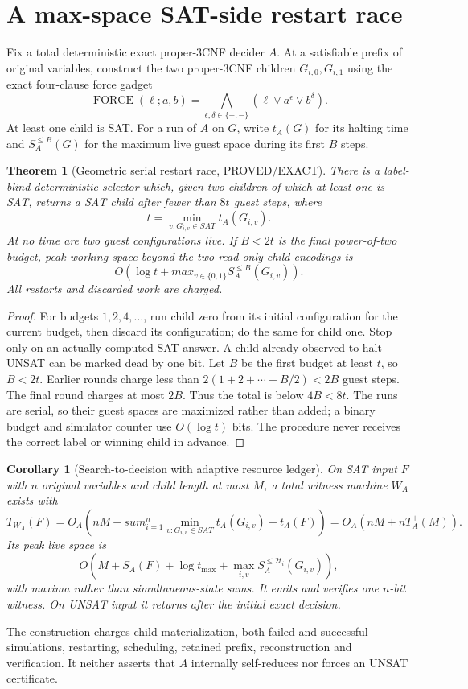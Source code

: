 \documentclass[11pt]{article}
\newtheorem{theorem}{Theorem}
\newtheorem{corollary}{Corollary}
\begin{document}
\section{A max-space SAT-side restart race}
Fix a total deterministic exact proper-3CNF decider $A$.  At a satisfiable
prefix of original variables, construct the two proper-3CNF children
$G_{i,0},G_{i,1}$ using the exact four-clause force gadget
\[
\operatorname{FORCE}(\ell;a,b)=
\bigwedge_{\epsilon,\delta\in\{+,-\}}
(\ell\vee a^\epsilon\vee b^\delta).
\tag{1}
\]
At least one child is SAT.  For a run of $A$ on $G$, write $t_A(G)$ for its
halting time and $S_A^{\le B}(G)$ for the maximum live guest space during its
first $B$ steps.

\begin{theorem}[Geometric serial restart race, PROVED/EXACT]\label{th:race}
There is a label-blind deterministic selector which, given two children of
which at least one is SAT, returns a SAT child after fewer than $8t$ guest
steps, where
\[
t=\min_{v:G_{i,v}\in SAT}t_A(G_{i,v}).
\tag{2}
\]
At no time are two guest configurations live.  If $B<2t$ is the final
power-of-two budget, peak working space beyond the two read-only child
encodings is
\[
O\!\left(\log t+max_{v\in\{0,1\}}S_A^{\le B}(G_{i,v})\right).
\tag{3}
\]
All restarts and discarded work are charged.
\end{theorem}
\begin{proof}
For budgets $1,2,4,\ldots$, run child zero from its initial configuration for
the current budget, then discard its configuration; do the same for child
one.  Stop only on an actually computed SAT answer.  A child already observed
to halt UNSAT can be marked dead by one bit.  Let $B$ be the first budget at
least $t$, so $B<2t$.  Earlier rounds charge less than
$2(1+2+\cdots+B/2)<2B$ guest steps.  The final round charges at most $2B$.
Thus the total is below $4B<8t$.  The runs are serial, so their guest spaces
are maximized rather than added; a binary budget and simulator counter use
$O(\log t)$ bits.  The procedure never receives the correct label or winning
child in advance.
\end{proof}

\begin{corollary}[Search-to-decision with adaptive resource ledger]
On SAT input $F$ with $n$ original variables and child length at most $M$, a
total witness machine $W_A$ exists with
\[
T_{W_A}(F)=O_A\!\left(nM+sum_{i=1}^n
\min_{v:G_{i,v}\in SAT}t_A(G_{i,v})+t_A(F)\right)
=O_A(nM+nT_A^+(M)).
\tag{4}
\]
Its peak live space is
\[
O\!\left(M+S_A(F)+\log t_{\max}+
\max_{i,v}S_A^{\le2t_i}(G_{i,v})\right),
\tag{5}
\]
with maxima rather than simultaneous-state sums.  It emits and verifies one
$n$-bit witness.  On UNSAT input it returns after the initial exact decision.
\end{corollary}
The construction charges child materialization, both failed and successful
simulations, restarting, scheduling, retained prefix, reconstruction and
verification.  It neither asserts that $A$ internally self-reduces nor forces
an UNSAT certificate.
\end{document}
